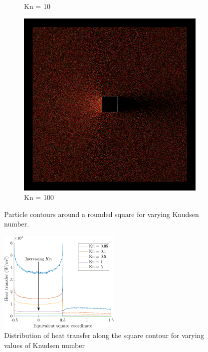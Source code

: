 \begin{figure}
\begin{subfigure}{0.32\textwidth}
        \caption{Kn = 10}
    \end{subfigure}
    \hfill
    \begin{subfigure}{0.32\textwidth}
        \centering
        \includegraphics[width=\textwidth]{Images/4. Results/Square Kn/particles/Kn100.png}
        \caption{Kn = 100}
    \end{subfigure}
    \caption{Particle contours around a rounded square for varying Knudsen number.}
    \label{fig:pcontoursquare}
\end{figure}

\begin{figure}
    \centering
    \includegraphics[width=0.52\textwidth]{Images/4. Results/Square Kn/htsec.pdf}
    \caption{Distribution of heat transfer along the square contour for varying values of Knudsen number}
    \label{fig:squarehtsec}
\end{figure}

